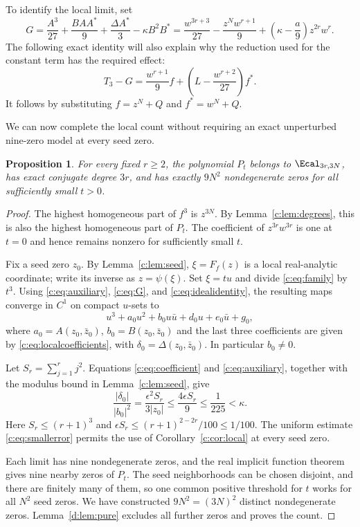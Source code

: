 \documentclass[UTF8,11pt]{ctexart}
\newtheorem{prop}[thm]{Proposition}
\theoremstyle{definition}
\numberwithin{equation}{section}
\begin{document}
To identify the local limit, set
\begin{equation}\label{c:eq:G}
 G=\frac{A^3}{27}+\frac{BAA^*}{9}
          +\frac{\Delta A^*}{3}-\kappa B^2B^*
   =\frac{w^{3r+3}}{27}-\frac{z^Nw^{r+1}}9
          +\left(\kappa-\frac a9\right)z^{2r}w^r.
\end{equation}
The following exact identity will also explain why the reduction used
for the constant term has the required effect:
\begin{equation}\label{c:eq:idealidentity}
 T_3-G=\frac{w^{r+1}}9f+
                \left(L-\frac{w^{r+2}}{27}\right)f^*.
\end{equation}
It follows by substituting $f=z^N+Q$ and $f^*=w^N+Q$.

We can now complete the local count without requiring an exact
unperturbed nine-zero model at every seed zero.
\begin{prop}\label{c:prop:family}
For every fixed $r\ge2$, the polynomial $P_t$ belongs to
$\Ecal_{3r,3N}$, has exact conjugate degree $3r$, and has exactly
$9N^2$ nondegenerate zeros for all sufficiently small $t>0$.
\end{prop}
\begin{proof}
The highest homogeneous part of $f^3$ is $z^{3N}$. By
Lemma~\ref{c:lem:degrees}, this is also the highest homogeneous part of
$P_t$. The coefficient of $z^{3r}w^{3r}$ is one at $t=0$ and hence
remains nonzero for sufficiently small $t$.

Fix a seed zero $z_0$. By Lemma~\ref{c:lem:seed},
$\xi=F_f(z)$ is a local real-analytic coordinate; write its inverse
as $z=\psi(\xi)$. Set $\xi=tu$ and divide \eqref{c:eq:family} by $t^3$.
Using \eqref{c:eq:auxiliary}, \eqref{c:eq:G}, and
\eqref{c:eq:idealidentity}, the resulting maps converge in $C^1$ on
compact $u$-sets to
\[
 u^3+a_0u^2+b_0u\bar u+d_0u+e_0\bar u+g_0,
\]
where $a_0=A(z_0,\bar z_0)$, $b_0=B(z_0,\bar z_0)$ and the last
three coefficients are given by \eqref{c:eq:localcoefficients}, with
$\delta_0=\Delta(z_0,\bar z_0)$. In particular $b_0\ne0$.

Let $S_r=\sum_{j=1}^rj^2$. Equations \eqref{c:eq:coefficient} and
\eqref{c:eq:auxiliary}, together with the modulus bound in
Lemma~\ref{c:lem:seed}, give
\begin{equation}\label{c:eq:smallerror}
 \frac{|\delta_0|}{|b_0|^2}
 =\frac{\epsilon^2S_r}{3|z_0|}
 \le\frac{4\epsilon S_r}{9}
 \le\frac1{225}<\kappa.
\end{equation}
Here $S_r\le(r+1)^3$ and
$\epsilon S_r\le(r+1)^{2-2r}/100\le1/100$.
The uniform estimate \eqref{c:eq:smallerror} permits the use of
Corollary~\ref{c:cor:local} at every seed zero.

Each limit has nine nondegenerate zeros, and the real implicit function
theorem gives nine nearby zeros of $P_t$. The seed neighborhoods can
be chosen disjoint, and there are finitely many of them, so one common
positive threshold for $t$ works for all $N^2$ seed zeros. We have
constructed $9N^2=(3N)^2$ distinct nondegenerate zeros.
Lemma~\ref{d:lem:pure} excludes all further zeros and proves the count.
\end{proof}
\end{document}
